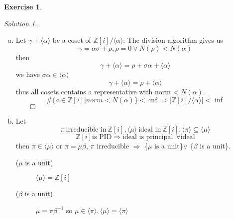 \documentclass[a4paper,twoside=false,abstract=false,numbers=noenddot,
titlepage=false,headings=small,parskip=half,version=last]{scrartcl}
\theoremstyle{definition}
\newtheorem{exercise}{Exercise}
\theoremstyle{remark}
\newtheorem*{solution}{Solution}
\newcommand{\ZZ}{\ensuremath{\mathbb{Z}}}
\begin{document}
\begin{exercise}
{\bf
}
\end{exercise}
\begin{solution}

\begin{enumerate}[a)]
    \item
        Let $\gamma + \langle \alpha \rangle$ be a coset of
        $\ZZ\left[i\right]/\langle \alpha \rangle$. The division algorithm
        gives us 
        \begin{equation}
            \gamma=\alpha\sigma + \rho,\rho=0 \vee N(\rho)<N(\alpha)
        \end{equation}
        then
        \begin{equation}
            \gamma+\langle\alpha\rangle=\rho+\sigma\alpha+\langle\alpha\rangle
        \end{equation}
        we have $\sigma\alpha\in\langle\alpha\rangle$
        \begin{equation}
            \gamma+\langle\alpha\rangle=\rho+\langle\alpha\rangle
        \end{equation}
        thus all cosets contains a representative with norm < $N(\alpha)$.
        \begin{equation}
            \#\{a\in\ZZ\left[i\right]|norm < N(\alpha)\}<\inf \Rightarrow
            |\ZZ\left[i\right] / \langle\alpha\rangle|<\inf
        \end{equation}
        $\qed$
    \item
        Let 
        \begin{equation}
            \pi ~\text{irreducible in}~ \ZZ\left[i\right],\langle\mu\rangle 
            ~\text{ideal in}~ \ZZ\left[i\right]
            :\langle\pi\rangle\subseteq\langle\mu\rangle
        \end{equation}
        \begin{equation}
            \ZZ\left[i\right] \text{is PID} \Rightarrow \text{ideal is
            principal} ~~\forall \text{ideal}
        \end{equation}
        then $\pi\in\langle\mu\rangle$ or $\pi=\mu\beta$, $\pi$ irreducible
        $\Rightarrow$ \{$\mu$ is a unit\}$\vee$ \{$\beta$ is a unit\}.
        \begin{description}
            \item[($\mu$ is a unit)] $\langle\mu\rangle=\ZZ\left[i\right]$
            \item[($\beta$ is a unit)] $\mu=\pi\beta^{-1}$ so
            $\mu\in\langle\pi\rangle,\langle\mu\rangle=\langle\pi\rangle$

\end{description}
\end{enumerate}
\end{solution}
\end{document}
